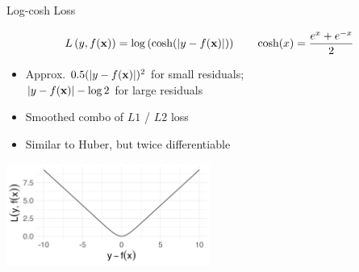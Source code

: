\documentclass[11pt,compress,t,notes=noshow, xcolor=table]{beamer}
\begin{document}
\begin{vbframe}{Log-cosh Loss }


$$
L\left(y, f(\mathbf{x})\right) = \log \left( \cosh(\left|y - f(\mathbf{x})\right|) \right) \qquad \text{cosh}(x)=\frac{e^x+e^{-x}}{2}
$$

\vfill

\begin{itemize}
\item Approx. $0.5 (\left|y - f(\mathbf{x})\right|)^2$ for small residuals;\\
$\left|y - f(\mathbf{x})\right| - \log 2$ for large residuals
\item Smoothed combo of $L1$ / $L2$ loss
\item Similar to Huber, but twice differentiable
\end{itemize}

\vfill

\begin{center}
\includegraphics[width = 0.5\textwidth]{figure/loss_logcosh.png}
\end{center}

\end{vbframe}
\end{document}
